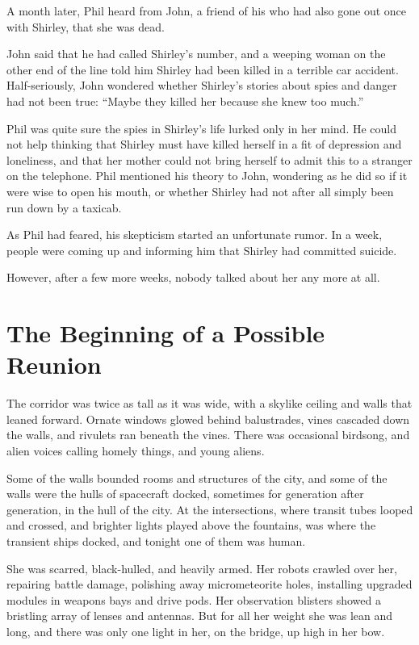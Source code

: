 \documentclass[english,11pt,letterpaper,onecolumn]{scrbook}
\begin{document}
	A month later, Phil heard from John, a friend of his who had also gone out once with Shirley, that she was dead.  

	John said that he had called Shirley's number, and a weeping woman on the other end of the line told him Shirley had been killed in a terrible car accident.  Half-seriously, John wondered whether Shirley's stories about spies and danger had not been true:  ``Maybe they killed her because she knew too much.''  

	Phil was quite sure the spies in Shirley's life lurked only in her mind.  He could not help thinking that Shirley must have killed herself in a fit of depression and loneliness, and that her mother could not bring herself to admit this to a stranger on the telephone.  Phil mentioned his theory to John, wondering as he did so if it were wise to open his mouth, or whether Shirley had not after all simply been run down by a taxicab.

	As Phil had feared, his skepticism started an unfortunate rumor.  In a week, people were coming up and informing him that Shirley had committed suicide.

	However, after a few more weeks, nobody talked about her any more at all.
	
\chapter{The Beginning of a Possible Reunion}

	The corridor was twice as tall as it was wide, with a skylike ceiling and walls that leaned forward.  Ornate windows glowed behind balustrades, vines cascaded down the walls, and rivulets ran beneath the vines.  There was occasional birdsong, and alien voices calling homely things, and young aliens.

	Some of the walls bounded rooms and structures of the city, and some of the walls were the hulls of spacecraft docked, sometimes for generation after generation, in the hull of the city.  At the intersections, where transit tubes looped and crossed, and brighter lights played above the fountains, was where the transient ships docked, and tonight one of them was human.

	She was scarred, black-hulled, and heavily armed.  Her robots crawled over her, repairing battle damage, polishing away micrometeorite holes, installing upgraded modules in weapons bays and drive pods.  Her observation blisters showed a bristling array of lenses and antennas.  But for all her weight she was lean and long, and there was only one light in her, on the bridge, up high in her bow.  
\end{document}
